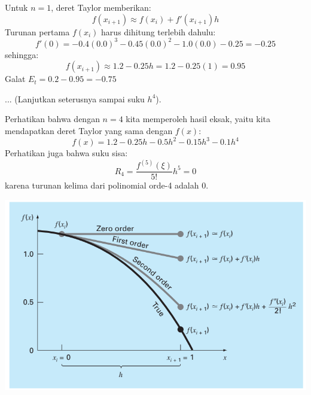 \begin{frame}
\fontsize{9}{10}\selectfont

Untuk $n=1$, deret Taylor memberikan:
$$
f(x_{i+1}) \approx f(x_{i}) + f'(x_{i+1})h
$$
Turunan pertama $f(x_{i})$ harus dihitung terlebih dahulu:
$$
f'(0) = -0.4(0.0)^3 - 0.45(0.0)^2 - 1.0(0.0) - 0.25 = -0.25
$$
sehingga:
$$
f(x_{i+1}) \approx 1.2 - 0.25h = 1.2 - 0.25(1) = 0.95
$$
Galat $E_t = 0.2 - 0.95 = -0.75$

... (Lanjutkan seterusnya sampai suku $h^4$).

Perhatikan bahwa dengan $n=4$ kita memperoleh hasil eksak, yaitu kita mendapatkan
deret Taylor yang sama dengan $f(x)$:
$$
f(x) = 1.2 - 0.25h - 0.5h^2 - 0.15h^3 - 0.1h^4
$$
Perhatikan juga bahwa suku sisa:
$$
R_{4} = \frac{f^{(5)}(\xi)}{5!} h^5 = 0
$$
karena turunan kelima dari polinomial orde-4 adalah 0.

\end{frame}



\begin{frame}

{\centering
\includegraphics[height=0.6\textheight]{../chapra_7th/Chapra_Fig_4_1.png}
\par}
    
\end{frame}



